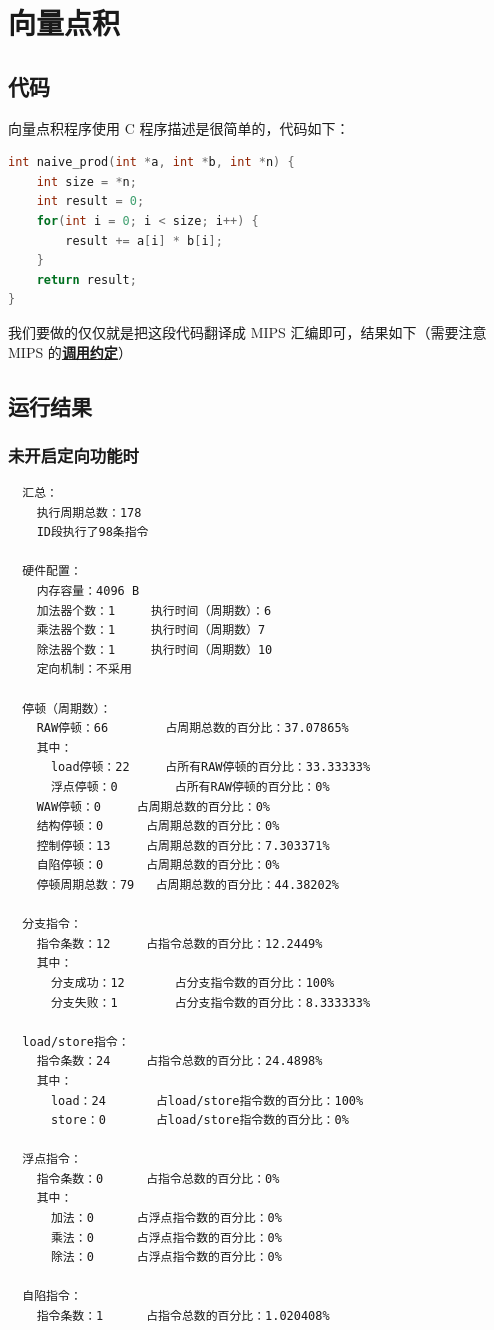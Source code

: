 \documentclass[blue,normal,cn]{elegantnote}
\begin{document}
\section{向量点积}

\subsection{代码}
向量点积程序使用 C 程序描述是很简单的，代码如下：

\begin{lstlisting}[language=C]
int naive_prod(int *a, int *b, int *n) {
    int size = *n;
    int result = 0;
    for(int i = 0; i < size; i++) {
        result += a[i] * b[i];
    }
    return result;
}
\end{lstlisting}

我们要做的仅仅就是把这段代码翻译成 MIPS 汇编即可，结果如下（需要注意 MIPS 的\href{https://courses.cs.washington.edu/courses/cse410/09sp/examples/MIPSCallingConventionsSummary.pdf}{\textbf{调用约定}}）



\subsection{运行结果}

\subsubsection{未开启定向功能时}

\begin{lstlisting}
  汇总：
    执行周期总数：178
    ID段执行了98条指令

  硬件配置：
    内存容量：4096 B
    加法器个数：1		执行时间（周期数）：6
    乘法器个数：1		执行时间（周期数）7		
    除法器个数：1		执行时间（周期数）10		
    定向机制：不采用

  停顿（周期数）：
    RAW停顿：66		占周期总数的百分比：37.07865%
    其中：
      load停顿：22		占所有RAW停顿的百分比：33.33333%
      浮点停顿：0		占所有RAW停顿的百分比：0%
    WAW停顿：0		占周期总数的百分比：0%
    结构停顿：0		占周期总数的百分比：0%
    控制停顿：13		占周期总数的百分比：7.303371%
    自陷停顿：0		占周期总数的百分比：0%
    停顿周期总数：79	占周期总数的百分比：44.38202%

  分支指令：
    指令条数：12		占指令总数的百分比：12.2449%
    其中：
      分支成功：12		占分支指令数的百分比：100%
      分支失败：1		占分支指令数的百分比：8.333333%

  load/store指令：
    指令条数：24		占指令总数的百分比：24.4898%
    其中：
      load：24		占load/store指令数的百分比：100%
      store：0		占load/store指令数的百分比：0%

  浮点指令：
    指令条数：0		占指令总数的百分比：0%
    其中：
      加法：0		占浮点指令数的百分比：0%
      乘法：0		占浮点指令数的百分比：0%
      除法：0		占浮点指令数的百分比：0%

  自陷指令：
    指令条数：1		占指令总数的百分比：1.020408%
\end{lstlisting}
\end{document}
